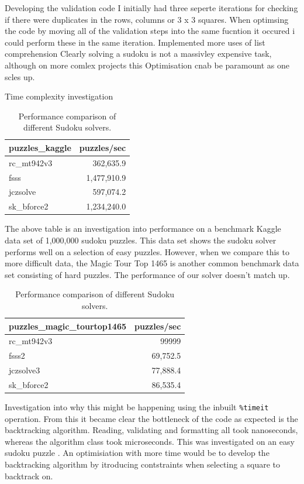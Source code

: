 \documentclass{report}
\def\code#1{\texttt{#1}}
\begin{document}
Developing the validation code I initially had three seperte iterations for checking if there were duplicates in the rows, columns or 3 x 3 squares.
When optimsing the code by moving all of the validation steps into the same fucntion it occured i could perform these in the same iteration.
Implemented more uses of list comprehension Clearly solving a sudoku is not a massivley expensive task, although on more comlex projects this Optimisation cnab be paramount as one scles up.

Time complexity investigation
\begin{table}[ht]
\centering
\begin{tabular}{l|r}
\hline
\textbf{puzzles\_kaggle} & \textbf{puzzles/sec} \\
\hline
rc\_mt942v3 & 362,635.9 \\
fsss \cite{4} & 1,477,910.9 \\
jczsolve \cite{5} & 597,074.2 \\
sk\_bforce2 \cite{6} & 1,234,240.0 \\
\hline
\end{tabular}
\caption{Performance comparison of different Sudoku solvers.}
\label{tab:sudoku_performance}
\end{table}


The above table is an investigation into performance on a benchmark Kaggle data set \cite{7} of 1,000,000 sudoku puzzles. This data set shows the sudoku solver performs well on a selection of easy puzzles. However, when we compare this to more difficult data, the Magic Tour Top 1465 is another common benchmark data set \cite{8} consisting of hard puzzles. The performance of our solver doesn't match up.

\begin{table}[ht]
\centering
\begin{tabular}{l|r}
\hline
\textbf{puzzles\_magic\_tourtop1465} & \textbf{puzzles/sec} \\
\hline
rc\_mt942v3 & 99999 \\
fsss2 & 69,752.5 \\
jczsolve3 & 77,888.4 \\
sk\_bforce2 & 86,535.4 \\
\hline
\end{tabular}
\caption{Performance comparison of different Sudoku solvers.}
\label{tab:sudoku_performance}
\end{table}

Investigation into why this might be happening using the inbuilt \code{\%timeit} operation. From this it became clear the bottleneck of the code as expected is the backtracking algorithm. Reading, validating and formatting all took nanoseconds, whereas the algorithm class took microseconds. This was investigated on an easy sudoku puzzle \cite{9}.  An optimisiation with more time would be to develop the backtracking algorithm by itroducing contstraints when selecting a square to backtrack on.
\end{document}
